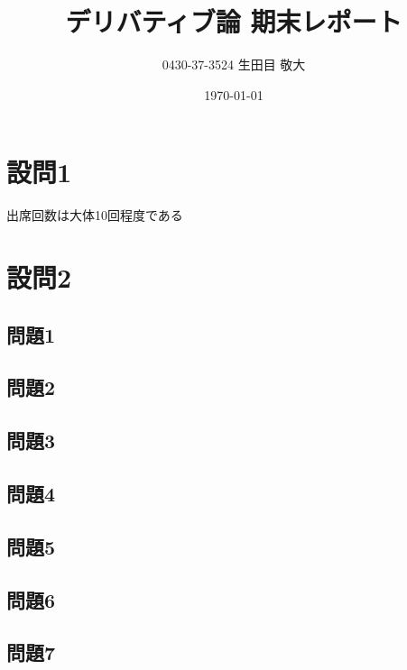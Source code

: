 \documentclass[uplatex,11pt,a4paper]{jsarticle}
\title{デリバティブ論 期末レポート}
\author{0430-37-3524  生田目 敬大}
\date{\today}
\theoremstyle{definition}
\theoremstyle{plain}
\theoremstyle{remark}
\begin{document}
\maketitle
\section*{設問1}
出席回数は大体10回程度である

\section*{設問2}
\subsection*{問題1}


\subsection*{問題2}


\subsection*{問題3}


\subsection*{問題4}


\subsection*{問題5}


\subsection*{問題6}


\subsection*{問題7}
\end{document}
